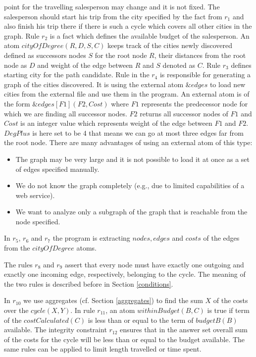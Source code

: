 \documentclass[a4paper, titlepage]{article}
\newcommand{\ext}[3]{\ensuremath{\&{#1}[#2](#3)}}
\begin{document}
point for the travelling salesperson may change and it is not 
fixed. The salesperson should start his trip from the 
city specified by the fact from $r_1$ and also finish 
his trip there if there is such a cycle which covers all 
other cities in the graph. Rule $r_2$ is a fact which defines the 
available budget of the salesperson. An atom $\mathit{cityOfDegree(R,D,S,C)}$ keeps 
track of the cities newly discovered defined as successors 
nodes $S$ for the root node $R$, their distances from the 
root node as $D$ and weight of the edge between $R$ and $S$ 
denoted as $C$. Rule $r_3$ defines starting city for 
the path candidate. Rule in the $r_4$ is responsible for 
generating a graph of 
the cities discovered. It is using the external atom 
$\mathit{\&edges}$ to load new cities from the external 
file and use them in the program. An external atom is of 
the form $\ext{edges}{F1}{F2,Cost}$ where $\mathit{F1}$ 
represents the predecessor node for which we are finding 
all successor 
nodes. $\mathit{F2}$ returns all successor nodes of 
$\mathit{F1}$ and $\mathit{Cost}$ is an integer value which 
represents weight of the edge between $\mathit{F1}$ and 
$\mathit{F2}$. $\mathit{DegPlus}$ is here set to be 4 that 
means we can go at most three edges far from the root node. 
There are many advantages of using an external atom of this
type:
\begin{itemize}
\item The graph may be very large and it is not possible to load it 
at once as a set of edges specified manually.
\item We do not know the graph completely (e.g., due to limited capabilities of a web service).
\item We want to analyze only a subgraph of the graph that is 
reachable from the node specified.
\end{itemize}    
In $r_5$, $r_6$ and $r_7$ the program is extracting 
$\mathit{nodes}, \mathit{edges}$ and $\mathit{costs}$ of 
the edges from the $\mathit{cityOfDegree}$ atoms. 

The rules $r_8$ and $r_{9}$ assert that every 
node must have exactly one outgoing and exactly one 
incoming edge, respectively, belonging to the cycle. The meaning of the two rules is described before in Section 
\ref{conditions}.

In $r_{10}$ we use aggregates (cf. Section 
\ref{aggregates}) to find the sum $X$ of the costs over the 
$\mathit{cycle(X,Y)}$. In rule $r_{11}$, an atom 
$\mathit{withinBudget(B,C)}$ is true if term of the 
$\mathit{costCalculated(C)}$ is less than or equal to the 
term of $\mathit{budgetB(B)}$ available. The integrity 
constraint $r_{12}$ ensures that in the answer 
set overall sum of the costs for the cycle will be less 
than or equal to the budget available. The same rules can be applied to limit length travelled or time spent.
\end{document}
